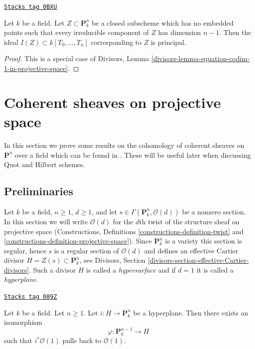 \begin{lemma}
\label{varieties-lemma-equation-codim-1-in-projective-space}
\href{https://stacks.math.columbia.edu/tag/0BXU}{\texttt{Stacks tag 0BXU}}

Let $k$ be a field. Let $Z \subset \mathbf{P}^n_k$ be a closed subscheme
which has no embedded points such that every irreducible component
of $Z$ has dimension $n - 1$. Then the ideal $I(Z) \subset k[T_0, \ldots, T_n]$
corresponding to $Z$ is principal.
\end{lemma}

\begin{proof}
This is a special case of
Divisors, Lemma \ref{divisors-lemma-equation-codim-1-in-projective-space}.
\end{proof}

\section{Coherent sheaves on projective space}
\label{varieties-section-coherent-Pn}
In this section we prove some results on the cohomology of coherent
sheaves on $\mathbf{P}^n$ over a field which can be found in
\cite{Mum}. These will be useful later
when discussing Quot and Hilbert schemes.

\subsection{Preliminaries}
\label{varieties-subsection-preliminaries}

Let $k$ be a field, $n \geq 1$, $d \geq 1$, and let
$s \in \Gamma(\mathbf{P}_k^n, \mathcal{O}(d))$
be a nonzero section. In this section we will write $\mathcal{O}(d)$
for the $d$th twist of the structure sheaf on projective space
(Constructions, Definitions \ref{constructions-definition-twist} and
\ref{constructions-definition-projective-space}).
Since $\mathbf{P}^n_k$ is a variety this section is regular, hence
$s$ is a regular section of $\mathcal{O}(d)$ and defines an effective
Cartier divisor $H = Z(s) \subset \mathbf{P}^n_k$, see
Divisors, Section \ref{divisors-section-effective-Cartier-divisors}.
Such a divisor $H$ is called a {\it hypersurface} and if $d = 1$
it is called a {\it hyperplane}.

\begin{lemma}[Hyperplane]
\label{varieties-lemma-hyperplane}
\href{https://stacks.math.columbia.edu/tag/089Z}{\texttt{Stacks tag 089Z}}

Let $k$ be a field. Let $n \geq 1$.
Let $i : H \to \mathbf{P}^n_k$ be a hyperplane.
Then there exists an isomorphism
$$
\varphi : \mathbf{P}^{n - 1}_k \longrightarrow H
$$
such that $i^*\mathcal{O}(1)$ pulls back to $\mathcal{O}(1)$.
\end{lemma}

